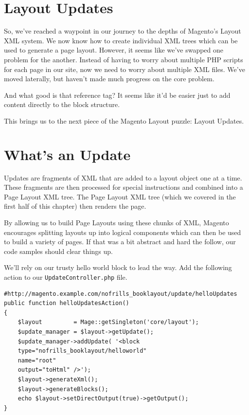 \documentclass[oneside]{book}
\begin{document}
\section{Layout Updates}

So, we've reached a waypoint in our journey to the depths of Magento's Layout XML system.  We now know how to create individual XML trees which can be used to generate a page layout.  However, it seems like we've swapped one problem for the another.  Instead of having to worry about multiple PHP scripts for each page in our site, now we need to worry about multiple XML files. We've moved laterally, but haven't made much progress on the core problem.

And what good is that reference tag?  It seems like it'd be easier just to add content directly to the block structure.

This brings us to the next piece of the Magento Layout puzzle:  Layout Updates.

\section{What's an Update}

Updates are fragments of XML that are added to a layout object one at a time.  These fragments are then processed for special instructions and combined into a Page Layout XML tree.  The Page Layout XML tree (which we covered in the first half of this chapter) then renders the page.

By allowing us to build Page Layouts using these chunks of XML, Magento encourages splitting layouts up into logical components which can then be used to build a variety of pages. If that was a bit abstract and hard the follow, our code samples should clear things up.

We'll rely on our trusty hello world block to lead the way.  Add the following action to our \footnotesize\texttt{UpdateController.php} \normalsize  file.

\begin{lstlisting}
#http://magento.example.com/nofrills_booklayout/update/helloUpdates
public function helloUpdatesAction()
{
    $layout         = Mage::getSingleton('core/layout');
    $update_manager = $layout->getUpdate();
    $update_manager->addUpdate( '<block
    type="nofrills_booklayout/helloworld"
    name="root"
    output="toHtml" />');
    $layout->generateXml();
    $layout->generateBlocks();
    echo $layout->setDirectOutput(true)->getOutput();
}

\end{lstlisting}
\end{document}
